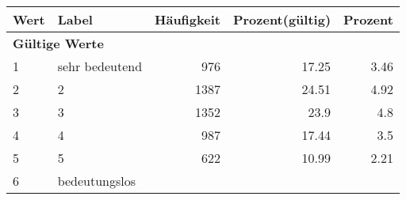      \begin{longtable}{lXrrr}
     \toprule
     \textbf{Wert} & \textbf{Label} & \textbf{Häufigkeit} & \textbf{Prozent(gültig)} & \textbf{Prozent} \\
     \endhead
     \midrule
     \multicolumn{5}{l}{\textbf{Gültige Werte}}\\

     1 &
     \multicolumn{1}{X}{ sehr bedeutend   } &


       \num{976} &
       \num[round-mode=places,round-precision=2]{17.25} &
         \num[round-mode=places,round-precision=2]{3.46} \\

     2 &
     \multicolumn{1}{X}{ 2   } &


       \num{1387} &
       \num[round-mode=places,round-precision=2]{24.51} &
         \num[round-mode=places,round-precision=2]{4.92} \\

     3 &
     \multicolumn{1}{X}{ 3   } &


       \num{1352} &
       \num[round-mode=places,round-precision=2]{23.9} &
         \num[round-mode=places,round-precision=2]{4.8} \\

     4 &
     \multicolumn{1}{X}{ 4   } &


       \num{987} &
       \num[round-mode=places,round-precision=2]{17.44} &
         \num[round-mode=places,round-precision=2]{3.5} \\

     5 &
     \multicolumn{1}{X}{ 5   } &


       \num{622} &
       \num[round-mode=places,round-precision=2]{10.99} &
         \num[round-mode=places,round-precision=2]{2.21} \\

     6 &
     \multicolumn{1}{X}{ bedeutungslos   } &



\end{longtable}
